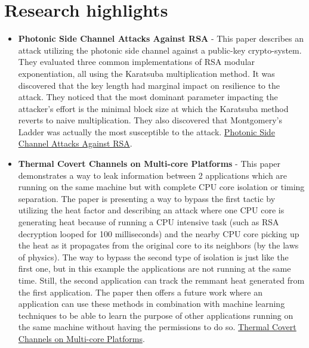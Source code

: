 \section{Research highlights} \label{sec:RelatedWork}
\begin{itemize}
    \item \textbf{Photonic Side Channel Attacks Against RSA} - This paper describes an attack utilizing the
    photonic side channel against a public-key crypto-system. They
    evaluated three common implementations of RSA modular exponentiation, all using the Karatsuba multiplication method.
    It was discovered that the key length had marginal impact on resilience to the attack.
    They noticed that the most dominant parameter impacting the attacker’s effort is the minimal block size at which the Karatsuba method reverts to naive multiplication.
    They also discovered that Montgomery’s Ladder was actually the most susceptible to the attack.
    \href{https://www.eng.tau.ac.il/~yash/ieee-host-2017.pdf}{Photonic Side Channel Attacks Against RSA}.

    \item \textbf{Thermal Covert Channels on Multi-core Platforms} - This paper demonstrates a way to leak information between 2 applications which are running on the same machine but with complete CPU core isolation or timing separation.
The paper is presenting a way to bypass the first tactic by utilizing the heat factor and describing an attack where one CPU core is generating heat because of running a CPU intensive task (such as RSA decryption looped for 100 milliseconds) and the nearby CPU core picking up the heat as it propagates from the original core to its neighbors (by the laws of physics).
The way to bypass the second type of isolation is just like the first one, but in this example the applications are not running at the same time. Still, the second application can track the remmant heat generated from the first application.
The paper then offers a future work where an application can use these methods in combination with machine learning techniques to be able to learn the purpose of other applications running on the same machine without having the permissions to do so.
    \href{https://www.usenix.org/conference/usenixsecurity15/technical-sessions/presentation/masti}{Thermal Covert Channels on Multi-core Platforms}.


\end{itemize}
